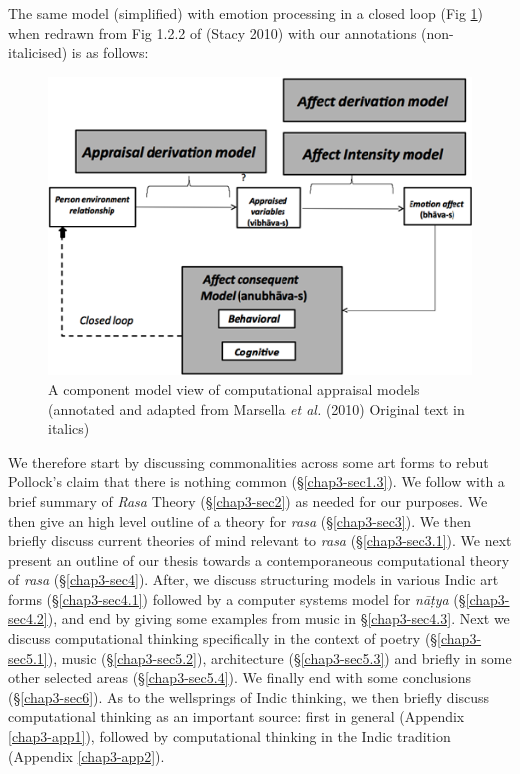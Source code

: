 The same model (simplified) with emotion processing in a closed loop (Fig \ref{chap3-fig2}) when redrawn from Fig 1.2.2 of (Stacy 2010) with our annotations (non-italicised) is as follows:

\begin{figure}[H]
\centering
\includegraphics[scale=.9]{figures/4.eps}
\caption{A component model view of computational appraisal models (annotated and adapted from Marsella \textsl{et al.} (2010) Original text in italics)}\label{chap3-fig2}
\end{figure}

We therefore start by discussing commonalities across some art forms to rebut Pollock’s claim that there is nothing common (\S\ref{chap3-sec1.3}). We follow with a brief summary of \textsl{Rasa} Theory (\S\ref{chap3-sec2}) as needed for our purposes. We then give an high level outline of a theory for \textsl{rasa} (\S\ref{chap3-sec3}). We then briefly discuss current theories of mind relevant to \textsl{rasa} (\S\ref{chap3-sec3.1}). We next present an outline of our thesis towards a contemporaneous computational theory of \textsl{rasa} (\S\ref{chap3-sec4}). After, we discuss structuring models in various Indic art forms (\S\ref{chap3-sec4.1}) followed by a computer systems model for \textsl{nāṭya} (\S\ref{chap3-sec4.2}), and end by giving some examples from music in \S\ref{chap3-sec4.3}. Next we discuss computational thinking specifically in the context of poetry (\S\ref{chap3-sec5.1}), music (\S\ref{chap3-sec5.2}), architecture (\S\ref{chap3-sec5.3}) and briefly in some other selected areas (\S\ref{chap3-sec5.4}). We finally end with some conclusions (\S\ref{chap3-sec6}). As to the wellsprings of Indic thinking, we then briefly discuss computational thinking as an important source: first in general (Appendix \ref{chap3-app1}), followed by computational thinking in the Indic tradition (Appendix \ref{chap3-app2}). 

